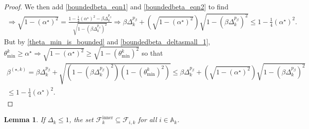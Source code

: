 \documentclass{article}
\newtheorem{lemma}[theorem]{Lemma}
\theoremstyle{case}
\newcommand{\dk}{\Delta_k}
\newcommand{\fik}{{\mathcal F_{i, k}}}
\newcommand{\bsk}{{\beta^{(\star, k)}}}
\newcommand{\fcki}{{\mathcal {F}^{\text{inner}}_k}}
\newcommand{\minanglealpha}{{ \alpha^{\star} }}
\newcommand{\activeconstraintsk}{{\mathbb A_{k}}}
\newcommand{\thetamink}{{\theta^k_{\text{min}}}}
\begin{document}
\begin{proof}
We then add \cref{boundedbeta_eqn1} and \cref{boundedbeta_eqn2} to find
\begin{align*}
\Longrightarrow \sqrt{1 - \left(\minanglealpha\right)^2} = \frac{1 -  \frac 1 4 \left(\minanglealpha\right)^2 - \beta\dk^{p_{\beta}}}{\sqrt{1 - \left(\beta\dk^{p_{\beta}}\right)^2}}
\Longrightarrow \beta\dk^{p_{\beta}} + \left(\sqrt{1 - \left(\minanglealpha\right)^2}\right)\sqrt{1 - \left(\beta\dk^{p_{\beta}}\right)^2} \le 1 -  \frac 1 4 \left(\minanglealpha\right)^2.
\end{align*}
But by \cref{theta_min_is_bounded} and \cref{boundedbeta_deltasmall_1}, 
$\thetamink \ge \minanglealpha \Longrightarrow \sqrt{1 - \left(\minanglealpha\right)^2} \ge \sqrt{1 - \left(\thetamink\right)^2}$
so that
\begin{align*}
\bsk 
= \beta\dk^{p_{\beta}} + \sqrt{\left(1 - \left(\beta\dk^{p_{\beta}}\right)^2\right)\left(1 - \left(\thetamink\right)^2\right)} 
\le \beta\dk^{p_{\beta}} + \left(\sqrt{1 - \left(\minanglealpha\right)^2}\right)\sqrt{1 - \left(\beta\dk^{p_{\beta}}\right)^2} \\
\le 1 -  \frac 1 4 \left(\minanglealpha\right)^2.
\end{align*}

\end{proof}


\begin{lemma}
\label{inner_cone_inside_each_cone}
If $\dk \le 1$, the set $\fcki \subseteq \fik$ for all $i \in \activeconstraintsk$.
\end{lemma}
\end{document}

